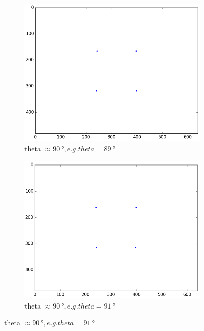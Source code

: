 \begin{figure}[H]
  \begin{subfigure}[b]{0.4\textwidth}
    \includegraphics[width=\textwidth]{./fig/9.png}
    \caption{theta $\approx \SI{90}{\degree}, e.g. theta = \SI{89}{\degree}$}
  \end{subfigure}
  \begin{subfigure}[b]{0.4\textwidth}
    \includegraphics[width=\textwidth]{./fig/11.png}
    \caption{theta $\approx \SI{90}{\degree}, e.g. theta = \SI{91}{\degree}$}
  \end{subfigure}
    

\end{figure}

